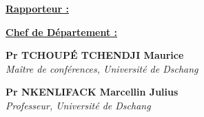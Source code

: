 \vspace{2em}

\noindent
\begin{minipage}[t]{0.47\linewidth}
\raggedright \underline{\textbf{Rapporteur :}}
\end{minipage}%
\hfill
\begin{minipage}[t]{0.47\linewidth}
\raggedright \underline{\textbf{Chef de Département :}}
\end{minipage}

\vspace{5.5em}

\noindent
\begin{minipage}[t]{0.47\linewidth}
\raggedright \textbf{Pr TCHOUPÉ TCHENDJI Maurice}\\[0.15em]
{\itshape\small Maître de conférences, Université de Dschang}
\end{minipage}%
\hfill
\begin{minipage}[t]{0.47\linewidth}
\raggedright \textbf{Pr NKENLIFACK Marcellin Julius}\\[0.15em]
{\itshape\small Professeur, Université de Dschang}
\end{minipage}

\vspace{1.5em}


